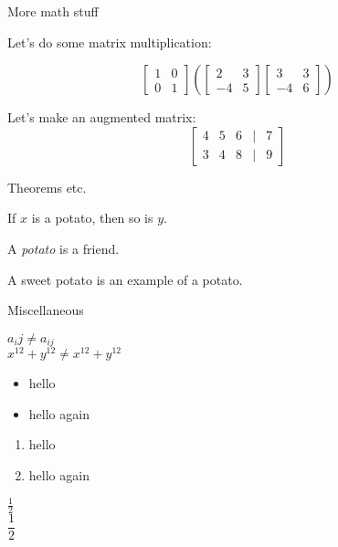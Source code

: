 \documentclass{beamer}
\begin{document}
\begin{frame}{More math stuff}

Let's do some matrix multiplication:

$$\begin{bmatrix}
1 & 0\\
0 & 1
\end{bmatrix}
\left(
\begin{bmatrix}
2 & 3\\
-4 & 5
\end{bmatrix} 
\begin{bmatrix}
3 & 3\\
-4 & 6
\end{bmatrix}\right)$$

Let's make an augmented matrix:\\

$$\begin{bmatrix}
4 & 5 & 6 & | & 7\\
3 & 4 & 8 & | & 9
\end{bmatrix}$$

\end{frame}

\begin{frame}{Theorems etc.}

\begin{Theorem}
If $x$ is a potato, then so is $y$.
\end{Theorem}

\begin{Definition}
A \emph{potato} is a friend.
\end{Definition}

\begin{Example}
A sweet potato is an example of a potato.
\end{Example}

\end{frame}

\begin{frame}{Miscellaneous}

$a_ij \neq a_{ij}$\\
$x^12 + y^12 \neq x^{12} + y^{12}$

\begin{itemize}
    \item hello
    \item hello again
\end{itemize}

\begin{enumerate}
    \item hello
    \item hello again
\end{enumerate}

$\frac{1}{2}$\\

$\dfrac{1}{2}$
\end{frame}
\end{document}
